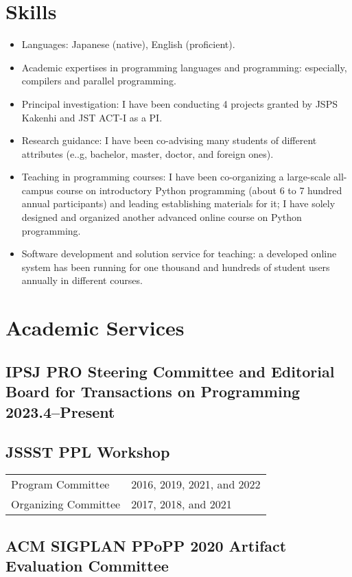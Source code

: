 \documentclass[a4paper,dvipdfmx]{article}
\newcommand{\datedsubsection}[2]{%
  \subsection[#1]{#1 \hfill #2}%
}
\begin{document}
\section{Skills}
\begin{itemize}
 \item Languages: Japanese (native), English (proficient).
 \item Academic expertises in programming languages and programming:
       especially, compilers and parallel programming.
 \item Principal investigation: I have been conducting 4 projects
       granted by JSPS Kakenhi and JST ACT-I as a PI.
 \item Research guidance: I have been co-advising many students of
       different attributes (e..g, bachelor, master, doctor, and foreign
       ones).
 \item Teaching in programming courses: I have been co-organizing a
       large-scale all-campus course on introductory Python programming
       (about 6 to 7 hundred annual participants) and leading
       establishing materials for it; I have solely designed and
       organized another advanced online course on Python programming.
 \item Software development and solution service for teaching: a
       developed online system has been running for one thousand and
       hundreds of student users annually in different courses.
\end{itemize}

\section{Academic Services}
\datedsubsection{IPSJ PRO Steering Committee and Editorial Board for Transactions on Programming}{2023.4--Present}
\subsection{JSSST PPL Workshop}
\begin{flushleft}
\begin{tabular}[t]{lp{12cm}}
Program Committee & 2016, 2019, 2021, and 2022 \\
Organizing Committee & 2017, 2018, and 2021 \\
\end{tabular}
\end{flushleft}
\subsection{ACM SIGPLAN PPoPP 2020 Artifact Evaluation Committee}
\end{document}
